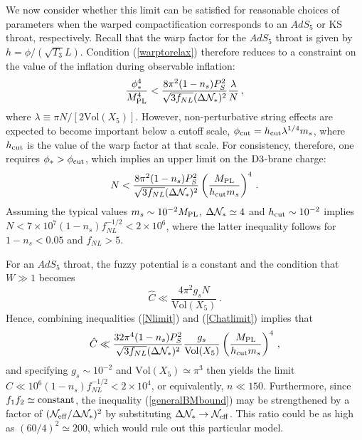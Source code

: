 We now consider whether this limit can be satisfied for reasonable choices 
of parameters when the warped compactification corresponds to 
an $AdS_5$ or KS throat, respectively. Recall that the warp 
factor for the $AdS_5$ throat is given by $h=\phi/(\sqrt{T_3}L)$.  
Condition (\ref{warptorelax}) therefore reduces to a constraint on the 
value of the inflation during observable inflation: 
\begin{equation}
\label{phivalue}
\frac{\phi_*^4}{M_{\mathrm{PL}}^4} < 
\frac{8\pi^2 (1-n_s)P_S^2}{\sqrt{3f_{NL}} ( \Delta {\cal{N}}_*)^2} 
\frac{\lambda}{N} \,,
\end{equation} 
where $\lambda \equiv \pi N/[2 \mathrm{Vol}(X_5)]$. 
However, non-perturbative string effects are expected to become 
important below a cutoff scale, $\phi_{\rm cut} = 
h_{\rm cut} \lambda^{1/4} m_s$, where $h_{\rm cut}$ is the value of the 
warp factor at that scale. For consistency, therefore, one requires 
$\phi_*>\phi_{\rm cut}$, which implies an upper limit on the 
${\rm D3}$-brane charge: 
\begin{equation}
\label{Nlimit}
N< \frac{8\pi^2 (1-n_s)P_S^2}{\sqrt{3f_{NL}} ( \Delta {\cal{N}}_*)^2}
\left( \frac{M_{\mathrm{PL}}}{h_{\rm cut}m_s} \right)^4  \,.
\end{equation}
Assuming the typical values $m_s \sim 10^{-2}M_{\mathrm{PL}}$, 
$\Delta {\cal{N}}_* \simeq 4$ and 
$h_{\rm cut} \sim 10^{-2}$ implies  
$N < 7 \times 10^7 (1-n_s)f_{NL}^{-1/2} < 2\times 10^6$, where 
the latter inequality follows for $1-n_s <0.05$ and $f_{NL} >5$. 

For an $AdS_5$ throat, the fuzzy potential 
is a constant and the condition that $W \gg 1$ becomes 
\begin{equation}
\label{Chatlimit}
\hat{C} \ll \frac{4\pi^2g_sN}{\mathrm{Vol}(X_5)} \,.
\end{equation}
Hence, combining inequalities 
(\ref{Nlimit}) and (\ref{Chatlimit}) implies that 
\begin{equation}
\label{nlimit}
\hat{C} \ll 
\frac{32 \pi^4 (1-n_s)P_S^2}{\sqrt{3f_{NL}} ( \Delta {\cal{N}}_*)^2}
\frac{g_s}{\mathrm{Vol} (X_5) }
\left( \frac{M_{\mathrm{PL}}}{h_{\rm cut}m_s} \right)^4  \,,
\end{equation}
and specifying $g_s \sim 10^{-2}$ and 
$\mathrm{Vol}(X_5) \simeq \pi^3$ then yields the limit  
$\hat{C} \ll 10^{6} (1-n_s)f_{NL}^{-1/2} < 2 \times 10^4$, or equivalently,  
$n \ll 150$. Furthermore, since $f_1f_2 \simeq {\rm constant}$, 
the inequality (\ref{generalBMbound}) may be strengthened by a 
factor of $(   {\cal{N}}_{\mathrm{eff}} /\Delta {\cal{N}}_*)^2$ by 
substituting 
$\Delta {\cal{N}}_* \rightarrow {\cal{N}}_{\mathrm{eff}}$. This ratio 
could be as 
high as $(60/4)^2 \simeq 200 $, which would rule out this particular
model. 

